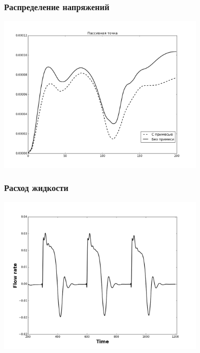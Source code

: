 \documentclass[14pt]{beamer}
\begin{document}
\begin{frame}
\frametitle{Распределение напряжений}
    \begin{center}
        \includegraphics[width=10cm]{forces_passive_point.png}
    \end{center}
\end{frame}

\begin{frame}
\frametitle{Расход жидкости}
    \begin{center}
        \includegraphics[width=10cm]{flowrate.png}
    \end{center}

\end{frame}
\end{document}
